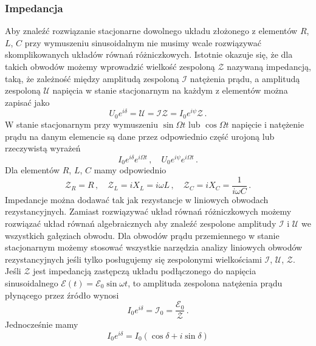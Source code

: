 \documentclass[../main.tex]{subfiles}
\begin{document}
\subsubsection{Impedancja}
Aby znaleźć rozwiązanie stacjonarne dowolnego układu złożonego z elementów \(R\), \(L\), \(C\) przy wymuszeniu sinusoidalnym nie musimy wcale rozwiązywać skomplikowanych układów równań różniczkowych. Istotnie okazuje się, że dla takich obwodów możemy wprowadzić wielkość zespoloną \(\mathcal{Z}\) nazywaną impedancją, taką, że zależność między amplitudą zespoloną \(\mathcal{I}\) natężenia prądu, a amplitudą zespoloną \(\mathcal{U}\) napięcia w stanie stacjonarnym na każdym z elementów można zapisać jako
\begin{equation*}
    U_0e^{i \delta}=\mathcal{U}=\mathcal{IZ}=I_0e^{i \psi}\mathcal{Z}\,.
\end{equation*}
W stanie stacjonarnym przy wymuszeniu \(\sin\Omega t\) lub \(\cos\Omega t\) napięcie i natężenie prądu na danym elemencie są dane przez odpowiednio część urojoną lub rzeczywistą wyrażeń
\begin{equation*}
    I_0e^{i\delta}e^{i\Omega t}\,,\quad U_0e^{i\psi}e^{i\Omega t}\,.
\end{equation*}
Dla elementów \(R\), \(L\), \(C\) mamy odpowiednio
\begin{equation*}
    \mathcal{Z}_R=R\,,\quad \mathcal{Z}_L=iX_L=i\omega L\,,\quad \mathcal{Z}_C=iX_C=\frac{1}{i\omega C}\,.
\end{equation*}
Impedancje można dodawać tak jak rezystancje w liniowych obwodach rezystancyjnych. Zamiast rozwiązywać układ równań różniczkowych możemy rozwiązać układ równań algebraicznych aby znaleźć zespolone amplitudy \(\mathcal{I}\) i \(\mathcal{U}\) we wszystkich gałęziach obwodu. Dla obwodów prądu przemiennego w stanie stacjonarnym możemy stosować wszystkie narzędzia analizy liniowych obwodów rezystancyjnych jeśli tylko posługujemy się zespolonymi wielkościami \(\mathcal{I}\), \(\mathcal{U}\), \(\mathcal{Z}\). Jeśli \(\mathcal{Z}\) jest impedancją zastępczą układu podłączonego do napięcia sinusoidalnego \(\mathcal{E}(t)=\mathcal{E}_0\sin\omega t\), to amplituda zespolona natężenia prądu płynącego przez źródło wynosi
\begin{equation*}
    I_0e^{i\delta}=\mathcal{I}_0=\frac{\mathcal{E}_0}{\mathcal{Z}}\,.
\end{equation*}
Jednocześnie mamy
\begin{equation*}
    I_0e^{i\delta}=I_0(\cos\delta+i\sin\delta)
\end{equation*}
\end{document}
